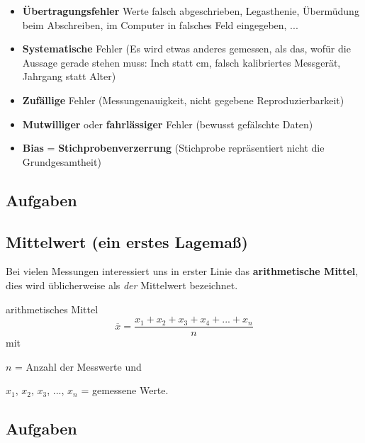 \begin{itemize}
  
\item \textbf{Übertragungsfehler} {Werte falsch abgeschrieben, 
  Legasthenie, Übermüdung beim Abschreiben, im Computer in falsches
  Feld eingegeben, ...}

\item \textbf{Systematische} Fehler (Es wird etwas anderes gemessen, als das,
  wofür die Aussage gerade stehen muss: Inch statt cm, falsch
  kalibriertes Messgerät, Jahrgang statt Alter)

\item \textbf{Zufällige} Fehler (Messungenauigkeit, nicht gegebene Reproduzierbarkeit)

\item \textbf{Mutwilliger} oder \textbf{fahrlässiger} Fehler (bewusst
  gefälschte Daten)

\item \textbf{Bias} =
  \textbf{Stichprobenverzerrung}
  (Stichprobe repräsentiert nicht die Grundgesamtheit)
\end{itemize}

\subsection*{Aufgaben}
\newpage


\subsection{Mittelwert (ein erstes Lagemaß)}
Bei vielen Messungen interessiert uns in erster Linie das
\textbf{arithmetische Mittel}, dies wird
üblicherweise als \textit{der} Mittelwert bezeichnet.

\begin{definition}{arithmetisches Mittel}{}
  $$\overline{x} = \frac{x_1 + x_2 + x_3 + x_4 + ... + x_n}{n}$$
  mit
  
  $n$ = Anzahl der Messwerte und

  $x_1$, $x_2$, $x_3$, ..., $x_n$ = gemessene Werte.
  \end{definition}

\subsection*{Aufgaben}
\newpage
